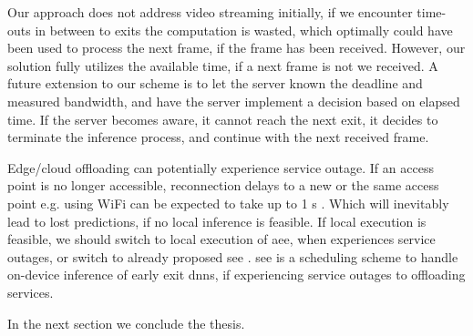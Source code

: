 Our approach does not address video streaming initially, if we encounter time-outs in between to exits the computation is wasted, which optimally could have been used to process the next frame, if the frame has been received. However, our solution fully utilizes the available time, if a next frame is not we received. A future extension to our scheme is to let the server known the deadline and measured bandwidth, and have the server implement a decision based on elapsed time. If the server becomes aware, it cannot reach the next exit, it decides to terminate the inference process, and continue with the next received frame.

Edge/cloud offloading can potentially experience service outage. If an access point is no longer accessible, reconnection delays to a new or the same access point e.g. using WiFi can be expected to take up to 1 s \cite{pei_why_2017}. Which will inevitably lead to lost predictions, if no local inference is feasible. If local execution is feasible, we should switch to local execution of \gls{aee}, when experiences service outages, or switch to already proposed \gls{see} \cite{wang_see:_2019}. \gls{see} is a scheduling scheme to handle on-device inference of early exit \gls{dnn}s, if experiencing service outages to offloading services.

In the next section we conclude the thesis. 

